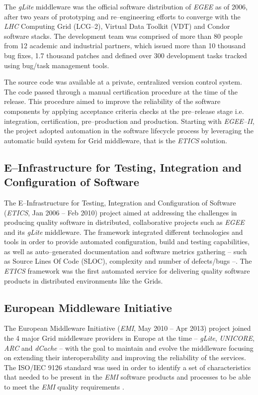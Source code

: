 \documentclass[journal]{IEEEtran}
\begin{document}
The {\sl gLite} middleware \cite{glite} was the
official software distribution of {\sl EGEE} as of 2006, after two years of prototyping and
re--engineering efforts to converge with the {\sl LHC} Computing Grid (LCG--2), Virtual
Data Toolkit (VDT) and Condor \cite{condor} software stacks. The
development team was comprised of more than 80 people from 12 academic and
industrial partners, which issued more than 10 thousand bug fixes, 1.7 thousand patches and
defined over 300 development tasks tracked using bug/task management tools.

The source code was available at a private, centralized version control system.
The code passed through a manual certification procedure at the time of the release.
This procedure aimed to improve the reliability of the software components by applying
acceptance criteria checks at the pre--release stage
\cite{egee:acceptance-criteria} i.e. integration, certification, pre--production and
production. Starting with {\sl EGEE--II}, the project adopted automation in the software
lifecycle process by leveraging the automatic build system for Grid middleware, that is
the {\sl ETICS} \cite{etics} solution.

\subsection{E--Infrastructure for Testing, Integration and Configuration of Software}

The E--Infrastructure for Testing, Integration and Configuration of Software~\cite{etics}
({\sl ETICS}, Jan 2006 -- Feb 2010) project aimed
at addressing the challenges in producing quality software in distributed,
collaborative projects such as {\sl EGEE} and its {\sl gLite} middleware. The framework
integrated different technologies and tools in order to provide automated configuration,
build and testing capabilities, as well as auto--generated documentation and
software metrics gathering -- such as Source Lines Of Code (SLOC), complexity and
number of defects/bugs \cite{etics} --. The {\sl ETICS} framework was the first automated
service for delivering quality software products in distributed environments like
the Grids.

\subsection{European Middleware Initiative}

The European Middleware Initiative ({\sl EMI}, May 2010 -- Apr 2013)
\cite{cordis:emi} project joined the 4 major Grid middleware providers in
Europe at the time -- {\sl gLite}, {\sl UNICORE}, {\sl ARC} and {\sl dCache} --
with the goal to maintain and evolve the middleware focusing on extending their
interoperability and improving the reliability of the services. The
ISO/IEC 9126 \cite{iso-9126} standard was used in order to identify a set of
characteristics that needed to be present in the {\sl EMI} software products and
processes to be able to meet the {\sl EMI} quality requirements
\cite{emi-quality-model}.
\end{document}
